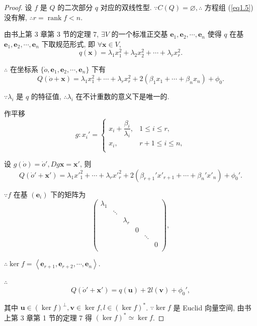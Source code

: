 \documentclass{ctexart}
\begin{document}
\begin{proof}
    设 $f$ 是 $Q$ 的二次部分 $q$ 对应的双线性型. $\because C(Q)=\varnothing,\therefore$ 方程组 (\ref{eq1.5}) 没有解, $\therefore r=\operatorname{rank}f<n$.

    由书上第 3 章第 3 节的定理 7, $\exists V$ 的一个标准正交基 $\boldsymbol{e}_1,\boldsymbol{e}_2,\cdots,\boldsymbol{e}_n$ 使得 $q$ 在基 $\boldsymbol{e}_1,\boldsymbol{e}_2,\cdots,\boldsymbol{e}_n$ 下取规范形式, 即 $\forall\boldsymbol{x}\in V$,
    \[q(\boldsymbol{x})=\lambda_1x^2_1+\lambda_2x^2_2+\cdots+\lambda_rx^2_r.\]

    $\therefore$ 在坐标系 $\{\dot{o},\boldsymbol{e}_1,\boldsymbol{e}_2,\cdots,\boldsymbol{e}_n\}$ 下有
    \[Q(\dot{o}+\boldsymbol{x})=\lambda_1x^2_1+\cdots+\lambda_rx^2_r+2(\beta_1x_1+\cdots+\beta_nx_n)+\phi_0.\]

    $\because\lambda_i$ 是 $q$ 的特征值, $\therefore\lambda_i$ 在不计重数的意义下是唯一的.

    作平移
    \[g:x_i'=\begin{cases}
        x_i+\dfrac{\beta_i}{\lambda_i}, & 1\leq i\leq r, \\
        x_i, & r+1\leq i\leq n, \\
    \end{cases}\]

    设 $g(\dot{o})=\dot{o}',Dg\boldsymbol{x}=\boldsymbol{x}'$, 则
    \[Q(\dot{o}'+\boldsymbol{x}')=\lambda_1x'^2_1+\cdots+\lambda_rx'^2_r+2(\beta_{r+1}'x'_{r+1}+\cdots+\beta_n'x'_n)+\phi_0'.\]

    $\because f$ 在基 $(\boldsymbol{e}_i)$ 下的矩阵为
    \[\begin{pmatrix}
        \lambda_1 \\
        & \ddots \\
        && \lambda_r \\
        &&& 0 \\
        &&&& \ddots \\
        &&&&& 0 \\
    \end{pmatrix},\]

    $\therefore\ker f=\left<\boldsymbol{e}_{r+1},\boldsymbol{e}_{r+2},\cdots,\boldsymbol{e}_n\right>$.

    $\therefore$
    \[Q(\dot{o}'+\boldsymbol{x}')=q(\boldsymbol{u})+2l(\boldsymbol{v})+\phi_0',\]

    其中 $\boldsymbol{u}\in(\ker f)^\perp,\boldsymbol{v}\in\ker f,l\in(\ker f)^*$. $\because\ker f$ 是 Euclid 向量空间, 由书上第 3 章第 1 节的定理 7 得 $(\ker f)^*\simeq\ker f$.
    

\end{proof}
\end{document}

